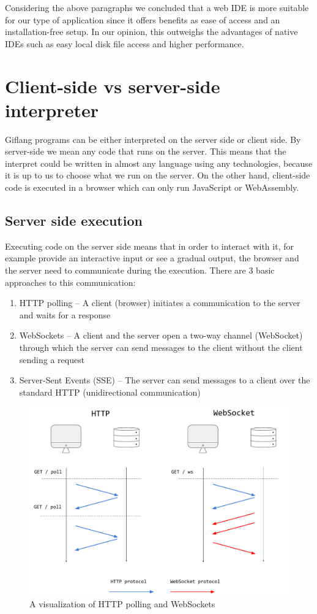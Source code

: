 Considering the above paragraphs we concluded that a web IDE is more suitable for our type of application since it offers benefits as
ease of access and an installation-free setup. In our opinion, this outweighs the advantages of native IDEs such as easy local disk
file access and higher performance.

\section{Client-side vs server-side interpreter}

Giflang programs can be either interpreted on the server side or client side. By server-side we mean any code that runs on the server. This means that
the interpret could be written in almost any language using any technologies, because it is up to us to choose what we run on the server. On the other hand,
client-side code is executed in a browser which can only run JavaScript or WebAssembly.

\subsection{Server side execution}
Executing code on the server side means that in order to interact with it, for example provide an interactive input or see a gradual output, the browser and
the server need to communicate during the execution. There are $3$ basic approaches to this communication:
\begin{enumerate}
    \item HTTP polling -- A client (browser) initiates a communication to the server and waits for a response
    \item WebSockets -- A client and the server open a two-way channel (WebSocket) through which the server can send messages to the client without
    the client sending a request 
    \item Server-Sent Events (SSE) -- The server can send messages to a client over the standard HTTP (unidirectional communication)
\end{enumerate}

\begin{figure}[!hbt]
	\includegraphics[width=\textwidth]{../img/websockets}
	\caption{A visualization of HTTP polling and WebSockets}
	\label{fig:chap2:websockets}
\end{figure}

